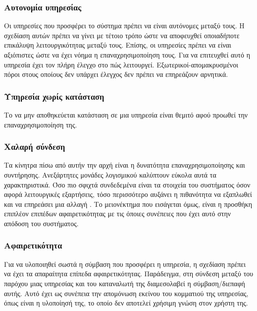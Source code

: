 \subsubsection{Αυτονομία υπηρεσίας}

Οι υπηρεσίες που προσφέρει το σύστημα πρέπει να είναι αυτόνομες 
μεταξύ τους. Η σχεδίαση αυτών πρέπει να γίνει με τέτοιο τρόπο ώστε να 
αποφευχθεί οποιαδήποτε επικάλυψη λειτουργικότητας μεταξύ τους. Επίσης, 
οι υπηρεσίες πρέπει να είναι αξιόπιστες ώστε να έχει νόημα η 
επαναχρησιμοποίηση τους. Για να επιτευχθεί αυτό η υπηρεσία έχει τον 
πλήρη έλεγχο στο πώς λειτουργεί. Εξωτερικοί-απομακρυσμένοι πόροι στους 
οποίους δεν υπάρχει έλεγχος δεν πρέπει να επηρεάζουν αρνητικά. 

\subsubsection{Υπηρεσία χωρίς κατάσταση}

Το να μην αποθηκεύεται κατάσταση σε μια υπηρεσία είναι θεμιτό 
αφού προωθεί την επαναχρησιμοποίηση της.

\subsubsection{Χαλαρή σύνδεση}

Τα κίνητρα πίσω από αυτήν την αρχή είναι η δυνατότητα 
επαναχρησιμοποίησης και συντήρησης. Ανεξάρτητες μονάδες λογισμικού 
καλύπτουν εύκολα αυτά τα χαρακτηριστικά. Όσο πιο σφιχτά συνδεδεμένα 
είναι τα στοιχεία του συστήματος όσον αφορά λειτουργικές εξαρτήσεις, 
τόσο περισσότερο αυξάνει η πιθανότητα να εξαπλωθεί και να επηρεάσει μια 
αλλαγή \citep{Meyer1994}. Το μειονέκτημα που εισάγεται όμως, είναι η 
προσθήκη επιπλέον επιπέδων αφαιρετικότητας με τις όποιες συνέπειες που 
έχει αυτό στην απόδοση του συστήματος.

\subsubsection{Αφαιρετικότητα}

Για να υλοποιηθεί σωστά η σύμβαση που προσφέρει η υπηρεσία, η 
σχεδίαση πρέπει να έχει τα απαραίτητα επίπεδα αφαιρετικότητας. 
Παράδειγμα, στη σύνδεση μεταξύ του παρόχου μιας υπηρεσίας και του 
καταναλωτή της διαμεσολαβεί η σύμβαση/διεπαφή αυτής. Αυτό έχει ως 
συνέπεια την απομόνωση εκείνου του κομματιού της υπηρεσίας, όπως είναι η 
υλοποίησή της, το οποίο δεν αποτελεί χρήσιμη γνώση στον χρήστη της. 

